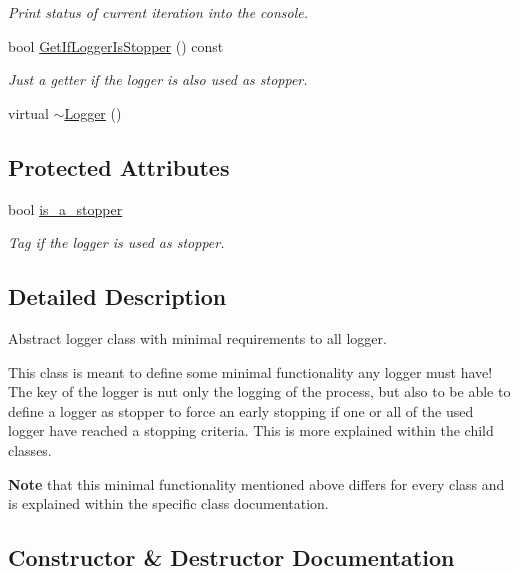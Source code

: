 \begin{DoxyCompactItemize}
\begin{DoxyCompactList}\small\item\em Print status of current iteration into the console. \end{DoxyCompactList}\item 
bool \mbox{\hyperlink{classlogger_1_1_logger_a3f473d158b7e5ee93ff70432d7f394ba}{Get\+If\+Logger\+Is\+Stopper}} () const
\begin{DoxyCompactList}\small\item\em Just a getter if the logger is also used as stopper. \end{DoxyCompactList}\item 
virtual \mbox{\hyperlink{classlogger_1_1_logger_aa85a309d218f9f006600cbaf2a348f52}{$\sim$\+Logger}} ()
\end{DoxyCompactItemize}
\subsection*{Protected Attributes}
\begin{DoxyCompactItemize}
\item 
bool \mbox{\hyperlink{classlogger_1_1_logger_a57ca2ab531e0a7ac74f4ecd4b74a938f}{is\+\_\+a\+\_\+stopper}}
\begin{DoxyCompactList}\small\item\em Tag if the logger is used as stopper. \end{DoxyCompactList}\end{DoxyCompactItemize}


\subsection{Detailed Description}
Abstract logger class with minimal requirements to all logger. 

This class is meant to define some minimal functionality any logger must have! The key of the logger is nut only the logging of the process, but also to be able to define a logger as stopper to force an early stopping if one or all of the used logger have reached a stopping criteria. This is more explained within the child classes.

{\bfseries Note} that this minimal functionality mentioned above differs for every class and is explained within the specific class documentation. 

\subsection{Constructor \& Destructor Documentation}
\mbox{\label{classlogger_1_1_logger_aa85a309d218f9f006600cbaf2a348f52}} 
